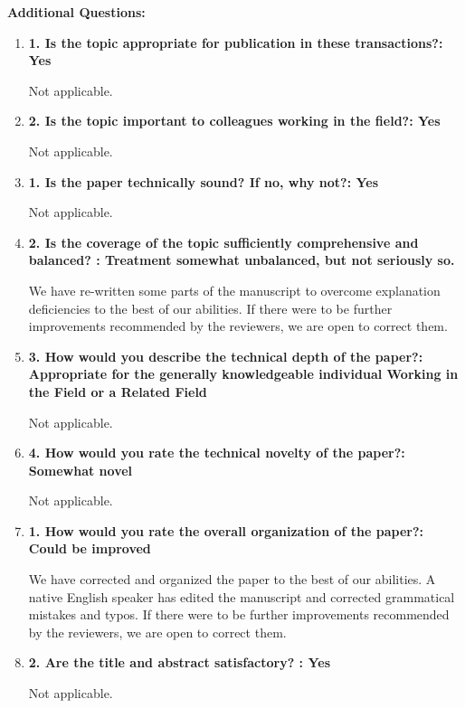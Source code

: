 \documentclass[12pt]{article}
\begin{document}
\textbf{Additional Questions:}

\begin{enumerate}

\item \textbf{1. Is the topic appropriate for publication in these transactions?: Yes}

Not applicable.

\item \textbf{2. Is the topic important to colleagues working in the field?: Yes}

Not applicable.

\item \textbf{1. Is the paper technically sound? If no, why not?: Yes}

Not applicable.

\item \textbf{2. Is the coverage of the topic sufficiently comprehensive and balanced? : 
Treatment somewhat unbalanced, but not seriously so.}

We have re-written some parts of the manuscript to overcome explanation deficiencies to 
the best of our abilities. If there 
were to be further improvements recommended by the reviewers, we are open to correct 
them.

\item \textbf{3. How would you describe the technical depth of the paper?: Appropriate 
for the generally knowledgeable individual Working in the Field or a Related Field}

Not applicable.

\item \textbf{4. How would you rate the technical novelty of the paper?: Somewhat novel}

Not applicable.

\item \textbf{1. How would you rate the overall organization of the paper?: Could be 
improved}

We have corrected and organized the paper to the best of our abilities.  A native 
English 
speaker has edited the manuscript and corrected grammatical mistakes and typos.  
If there 
were to be further improvements recommended by the reviewers, we are open to correct 
them. 
 

\item \textbf{2. Are the title and abstract satisfactory? : Yes}

Not applicable.

\end{enumerate}
\end{document}
